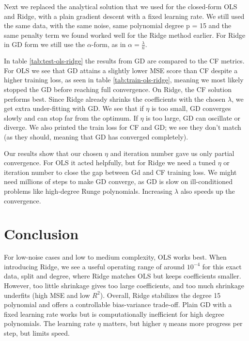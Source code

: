 \documentclass[amssymb,twocolumn,aps]{revtex4-2}
\begin{document}
Next we replaced the analytical solution that we used for the closed-form OLS and Ridge, with a plain gradient descent with a fixed learning rate. We still used the same data, with the same noise, same polynomial degree p = 15 and the same penalty term we found worked well for the Ridge method earlier. For Ridge in GD form we still use the $\alpha$-form, as in $\alpha=\frac{\lambda}{n}$. 

In table \ref{tab:test-ols-ridge} the results from GD are compared to the CF metrics. For OLS we see that GD attains a slightly lower MSE score than CF despite a higher training loss, as seen in table \ref{tab:train-ols-ridge}, meaning we most likely stopped the GD before reaching full convergence. On Ridge, the CF solution performs best. Since Ridge already shrinks the coefficients with the chosen $\lambda$, we get extra under-fitting with GD. We see that if $\eta$ is too small, GD converges slowly and can stop far from the optimum. If $\eta$ is too large, GD can oscillate or diverge. We also printed the train loss for CF and GD; we see they don't match (as they should, meaning that GD has converged completely).

Our results show that our chosen $\eta$ and iteration number gave us only partial convergence. For OLS it acted helpfully, but for Ridge we need a tuned $\eta$ or iteration number to close the gap between Gd and CF training loss. We might need millions of steps to make GD converge, as GD is slow on ill-conditioned problems like high-degree Runge polynomials. Increasing $\lambda$ also speeds up the convergence. 





\section{Conclusion}\label{section:conclusion} 

For low-noise cases and low to medium complexity, OLS works best. When introducing Ridge, we see a useful operating range of around $10^{-4}$ for this exact data, split and degree, where Ridge matches OLS but keeps coefficients smaller. However, too little shrinkage gives too large coefficients, and too much shrinkage underfits (high MSE and low $R^2$). Overall, Ridge stabilizes the degree 15 polynomial and offers a controllable bias-variance trade-off. Plain GD with a fixed learning rate works but is computationally inefficient for high degree polynomials. The learning rate $\eta$ matters, but higher $\eta$ means more progress per step, but limits speed. 



\end{document}
